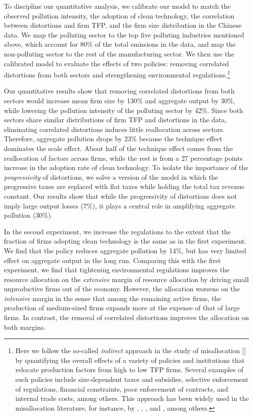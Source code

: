 \documentclass[AEJ]{AEA}
\begin{document}
To discipline our quantitative analysis, we calibrate our model to match the observed pollution intensity, the adoption of clean technology, the correlation between distortions and firm TFP, and the firm size distribution in the Chinese data. We map the polluting sector to the top five polluting industries mentioned above, which account for 80\% of the total emissions in the data, and map the non-polluting sector to the rest of the manufacturing sector. We then use the calibrated model to evaluate the effects of two policies: removing correlated distortions from both sectors and strengthening environmental regulations.\footnote{Here we follow the so-called \textit{indirect} approach in the study of misallocation [\citet{RestucciaRogerson:2013}] by quantifying the overall effects of a variety of policies and institutions that relocate production factors from high to low TFP firms. Several examples of such policies include size-dependent taxes and subsidies, selective enforcement of regulations, financial constraints, poor enforcement of contracts, and internal trade costs, among others. This approach has been widely used in the misallocation literature, for instance, by \citet{HsiehKlenow:2009, HsiehKlenow:2014}, \citet{Bartelsmanetal:2013}, \citet{AdamopoulosRestuccia:2014}, and \citet{BentoRestuccia:2016}, among others.}

Our quantitative results show that removing correlated distortions from both sectors would increase mean firm size by 130\% and aggregate output by 30\%, while lowering the pollution intensity of the polluting sector by 42\%. Since both sectors share similar distributions of firm TFP and distortions in the data, eliminating correlated distortions induces little reallocation across sectors. Therefore, aggregate pollution drops by 23\% because the technique effect dominates the scale effect. About half of the technique effect comes from the reallocation of factors across firms, while the rest is from a 27 percentage points increase in the adoption rate of clean technology. To isolate the importance of the \textit{progressivity} of distortions, we solve a version of the model in which the progressive taxes are replaced with flat taxes while holding the total tax revenue constant. Our results show that while the progressivity of distortions does not imply large output losses (7\%), it plays a central role in amplifying aggregate pollution (30\%).

In the second experiment, we increase the regulations to the extent that the fraction of firms adopting clean technology is the same as in the first experiment. We find that the policy reduces aggregate pollution by 14\%, but has very limited effect on aggregate output in the long run. Comparing this with the first experiment, we find that tightening environmental regulations {improves} the resource allocation on the \textit{extensive} margin of resource allocation by driving small unproductive firms out of the economy. However, the allocation {worsens} on the \textit{intensive} margin in the sense that among the remaining active firms, the production of medium-sized firms expands more at the expense of that of large firms. In contrast, the removal of correlated distortions improves the allocation on both margins.
\end{document}
